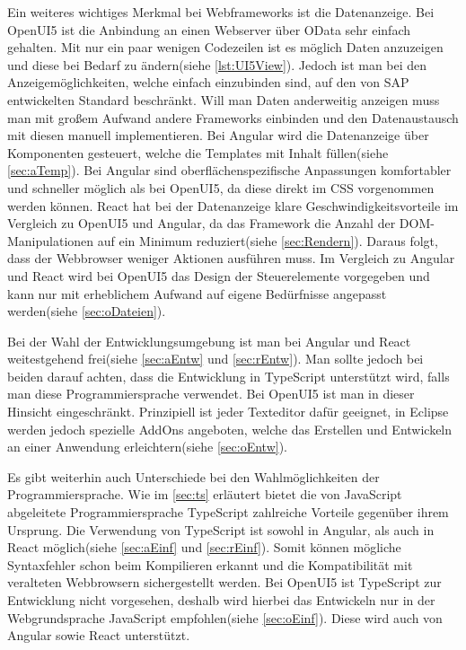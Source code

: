Ein weiteres wichtiges Merkmal bei Webframeworks ist die Datenanzeige. Bei OpenUI5 ist die Anbindung an einen Webserver über OData sehr einfach gehalten. Mit nur ein paar wenigen Codezeilen ist es möglich Daten anzuzeigen und diese bei Bedarf zu ändern(siehe \autoref{lst:UI5View}). Jedoch ist man bei den Anzeigemöglichkeiten, welche einfach einzubinden sind, auf den von SAP entwickelten Standard beschränkt. Will man Daten anderweitig anzeigen muss man mit großem Aufwand andere Frameworks einbinden und den Datenaustausch mit diesen manuell implementieren. Bei Angular wird die Datenanzeige über Komponenten gesteuert, welche die Templates mit Inhalt füllen(siehe \autoref{sec:aTemp}). Bei Angular sind oberflächenspezifische Anpassungen komfortabler und schneller möglich als bei OpenUI5, da diese direkt im CSS vorgenommen werden können. React hat bei der Datenanzeige klare Geschwindigkeitsvorteile im Vergleich zu OpenUI5 und Angular, da das Framework die Anzahl der DOM-Manipulationen auf ein Minimum reduziert(siehe \autoref{sec:Rendern}). Daraus folgt, dass der Webbrowser weniger Aktionen ausführen muss. Im Vergleich zu Angular und React wird bei OpenUI5 das Design der Steuerelemente vorgegeben und kann nur mit erheblichem Aufwand auf eigene Bedürfnisse angepasst werden(siehe \autoref{sec:oDateien}).  

Bei der Wahl der Entwicklungsumgebung ist man bei Angular und React weitestgehend frei(siehe \autoref{sec:aEntw} und \ref{sec:rEntw}). Man sollte jedoch bei beiden darauf achten, dass die Entwicklung in TypeScript unterstützt wird, falls man diese Programmiersprache verwendet. Bei OpenUI5 ist man in dieser Hinsicht eingeschränkt. Prinzipiell ist jeder Texteditor dafür geeignet, in Eclipse werden jedoch spezielle AddOns angeboten, welche das Erstellen und Entwickeln an einer Anwendung erleichtern(siehe \autoref{sec:oEntw}).

Es gibt weiterhin auch Unterschiede bei den Wahlmöglichkeiten der Programmiersprache. Wie im \autoref{sec:ts} erläutert bietet die von JavaScript abgeleitete Programmiersprache TypeScript zahlreiche Vorteile gegenüber ihrem Ursprung. Die Verwendung von TypeScript ist sowohl in Angular, als auch in React möglich(siehe \autoref{sec:aEinf} und \ref{sec:rEinf}). Somit können mögliche Syntaxfehler schon beim Kompilieren erkannt und die Kompatibilität mit veralteten Webbrowsern sichergestellt werden. Bei OpenUI5 ist TypeScript zur Entwicklung nicht vorgesehen, deshalb wird hierbei das Entwickeln nur in der Webgrundsprache JavaScript empfohlen(siehe \autoref{sec:oEinf}). Diese wird auch von Angular sowie React unterstützt.

